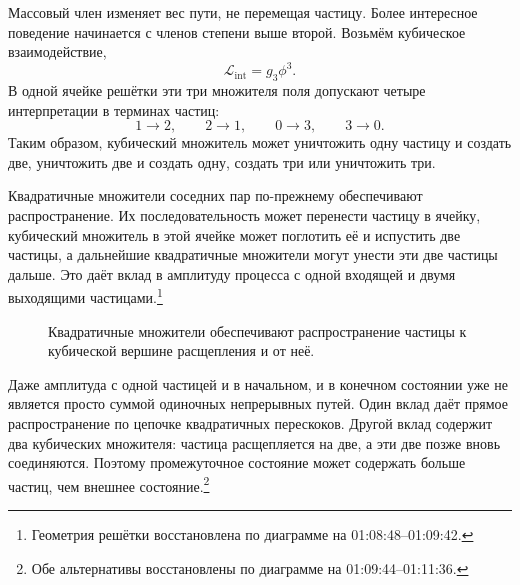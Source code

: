 Массовый член изменяет вес пути, не перемещая частицу. Более интересное поведение начинается с членов степени выше второй. Возьмём кубическое взаимодействие,
\begin{equation}
\mathcal{L}_{\mathrm{int}}=g_3\phi^3.
\end{equation}
В одной ячейке решётки эти три множителя поля допускают четыре интерпретации в терминах частиц:
\begin{equation}
1\longrightarrow 2,
\qquad
2\longrightarrow 1,
\qquad
0\longrightarrow 3,
\qquad
3\longrightarrow 0.
\end{equation}
Таким образом, кубический множитель может уничтожить одну частицу и создать две, уничтожить две и создать одну, создать три или уничтожить три.

Квадратичные множители соседних пар по-прежнему обеспечивают распространение. Их последовательность может перенести частицу в ячейку, кубический множитель в этой ячейке может поглотить её и испустить две частицы, а дальнейшие квадратичные множители могут унести эти две частицы дальше. Это даёт вклад в амплитуду процесса с одной входящей и двумя выходящими частицами.\footnote{Геометрия решётки восстановлена по диаграмме на 01:08:48--01:09:42.}

\begin{figure}[htbp]
\centering
{}
\caption{Квадратичные множители обеспечивают распространение частицы к кубической вершине расщепления и от неё.}
\end{figure}

Даже амплитуда с одной частицей и в начальном, и в конечном состоянии уже не является просто суммой одиночных непрерывных путей. Один вклад даёт прямое распространение по цепочке квадратичных перескоков. Другой вклад содержит два кубических множителя: частица расщепляется на две, а эти две позже вновь соединяются. Поэтому промежуточное состояние может содержать больше частиц, чем внешнее состояние.\footnote{Обе альтернативы восстановлены по диаграмме на 01:09:44--01:11:36.}

